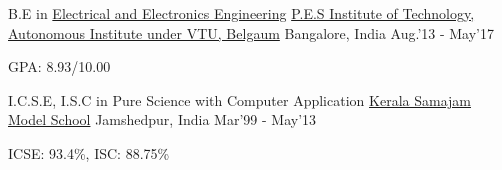 \begin{cventries}
	\cventry
	{B.E in \href{https://eee.pes.edu/}{Electrical and Electronics Engineering}}
	{\href{https://pesit.pes.edu/}{P.E.S Institute of Technology, Autonomous Institute under VTU, Belgaum}}
	{Bangalore, India}
	{Aug.'13 - May'17}
	{
		\begin{cvitems}
		\item{GPA: 8.93/10.00}
		\end{cvitems}
	}
\end{cventries}
\begin{cventries}
	\cventry
	{I.C.S.E, I.S.C in {Pure Science with Computer Application}}
	{\href{https://ksms.ac.in/}{Kerala Samajam Model School}}
	{Jamshedpur, India}
	{Mar'99 - May'13}
	{
		\begin{cvitems}
		\item{ICSE: 93.4\%, ISC: 88.75\%}
		\end{cvitems}
	}
\end{cventries}
